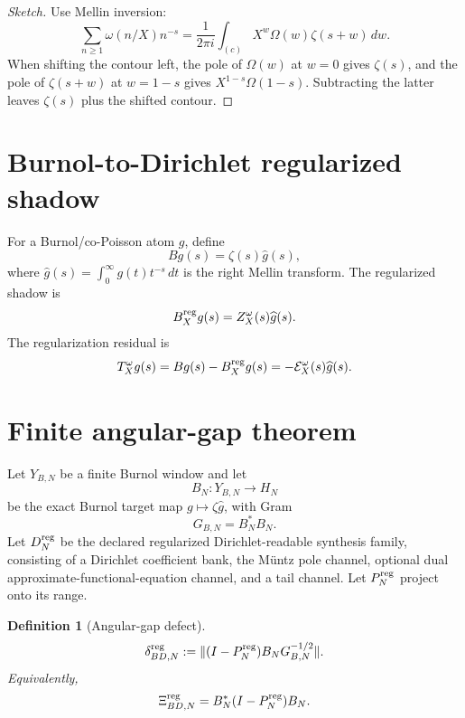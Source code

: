 \documentclass[11pt]{article}
\newtheorem{definition}{Definition}
\begin{document}
\begin{proof}[Sketch]
Use Mellin inversion:
\[
  \sum_{n\ge1}\omega(n/X)n^{-s}
  =
  \frac1{2\pi i}\int_{(c)}X^w\Omega(w)\zeta(s+w)\,dw.
\]
When shifting the contour left, the pole of \(\Omega(w)\) at \(w=0\) gives \(\zeta(s)\), and the pole of \(\zeta(s+w)\) at \(w=1-s\) gives \(X^{1-s}\Omega(1-s)\). Subtracting the latter leaves \(\zeta(s)\) plus the shifted contour.
\end{proof}

\section{Burnol-to-Dirichlet regularized shadow}
For a Burnol/co-Poisson atom \(g\), define
\[
  B g(s)=\zeta(s)\widehat g(s),
\]
where \(\widehat g(s)=\int_0^\infty g(t)t^{-s}\,dt\) is the right Mellin transform.
The regularized shadow is
\[
  B_X^{\rm reg}g(s)=Z_X^\omega(s)\widehat g(s).
\]
The regularization residual is
\[
  T_X^\omega g(s)=B g(s)-B_X^{\rm reg}g(s)
  =-\mathcal E_X^\omega(s)\widehat g(s).
\]

\section{Finite angular-gap theorem}
Let \(Y_{B,N}\) be a finite Burnol window and let
\[
  B_N:Y_{B,N}\to H_N
\]
be the exact Burnol target map \(g\mapsto \zeta\widehat g\), with Gram
\[
  G_{B,N}=B_N^*B_N.
\]
Let \(D_N^{\rm reg}\) be the declared regularized Dirichlet-readable synthesis family, consisting of a Dirichlet coefficient bank, the M\"untz pole channel, optional dual approximate-functional-equation channel, and a tail channel.  Let \(P_N^{\rm reg}\) project onto its range.

\begin{definition}[Angular-gap defect]
\[
  \delta_{BD,N}^{\rm reg}
  :=
  \|(I-P_N^{\rm reg})B_NG_{B,N}^{-1/2}\|.
\]
Equivalently,
\[
  \Xi_{BD,N}^{\rm reg}
  =B_N^*(I-P_N^{\rm reg})B_N.
\]
\end{definition}
\end{document}
